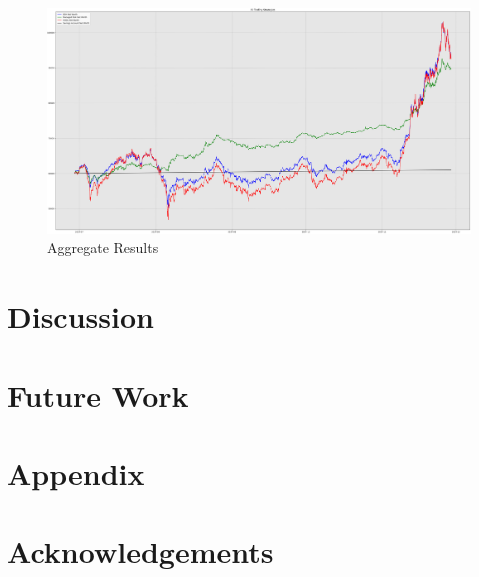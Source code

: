 \documentclass[journal]{new-aiaa}
\begin{document}
\begin{figure}[hbt!]
        \centering
        \includegraphics[width=\textwidth]{figures/aggregate_model_results.png}
        \caption{Aggregate Results}
        \label{fig:Aggregate Results}
\end{figure}

\section{Discussion}\label{sec:Discussion}

\section{Future Work}\label{sec:Future_Work}

\section*{Appendix}\label{sec:Appendix}

\section*{Acknowledgements}\label{sec:Acknowledgements}


\end{document}
